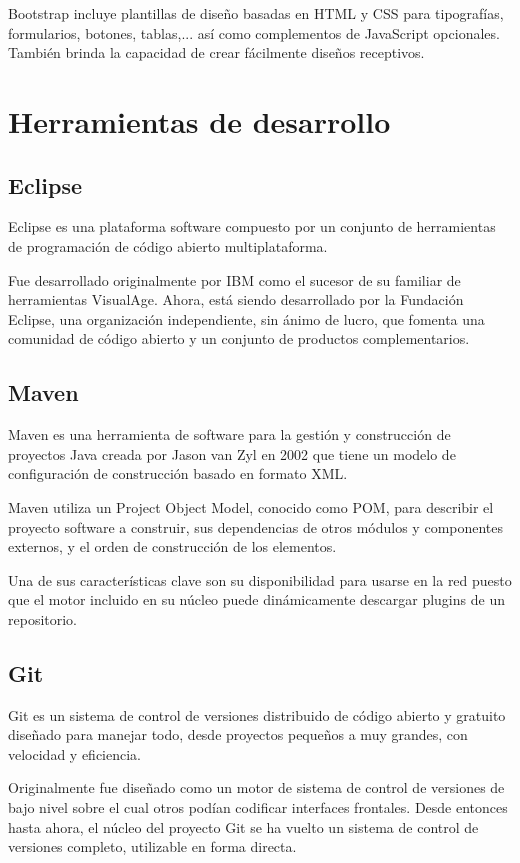Bootstrap incluye plantillas de diseño basadas en HTML y CSS para tipografías, formularios, botones, tablas,... así como complementos de JavaScript opcionales. También brinda la capacidad de crear fácilmente diseños receptivos.


\section{Herramientas de desarrollo}
\subsection{Eclipse}
Eclipse es una plataforma software compuesto por un conjunto de herramientas de programación de código abierto multiplataforma.

Fue desarrollado originalmente por IBM como el sucesor de su familiar de herramientas VisualAge. Ahora, está siendo desarrollado por la Fundación Eclipse, una organización independiente, sin ánimo de lucro, que fomenta una comunidad de código abierto y un conjunto de productos complementarios.

\subsection{Maven}
Maven es una herramienta de software para la gestión y construcción de proyectos Java creada por Jason van Zyl en 2002 que tiene un modelo de configuración de construcción basado en formato XML.

Maven utiliza un Project Object Model, conocido como POM, para describir el proyecto software a construir, sus dependencias de otros módulos y componentes externos, y el orden de construcción de los elementos.

Una de sus características clave son su disponibilidad para usarse en la red puesto que el motor incluido en su núcleo puede dinámicamente descargar plugins de un repositorio.


\subsection{Git}
Git es un sistema de control de versiones distribuido de código abierto y gratuito diseñado para manejar todo, desde proyectos pequeños a muy grandes, con velocidad y eficiencia.

Originalmente fue diseñado como un motor de sistema de control de versiones de bajo nivel sobre el cual otros podían codificar interfaces frontales. Desde entonces hasta ahora, el núcleo del proyecto Git se ha vuelto un sistema de control de versiones completo, utilizable en forma directa.

